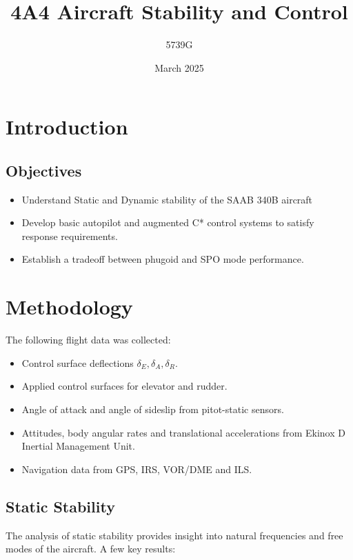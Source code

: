 \documentclass{article}
\begin{document}
\title{4A4 Aircraft Stability and Control}
\author{5739G}
\date{March 2025}
\maketitle

\section{Introduction}



\subsection{Objectives}

\begin{itemize}
    \item Understand Static and Dynamic stability of the SAAB 340B aircraft
    \item Develop basic autopilot and augmented C* control systems to satisfy response requirements.
    \item Establish a tradeoff between phugoid and SPO mode performance.
\end{itemize}

\section{Methodology}

The following flight data was collected:
\begin{itemize}
    \item Control surface deflections $\delta_E, \delta_A, \delta_R$.
    \item Applied control surfaces for elevator and rudder.
    \item Angle of attack and angle of sideslip from pitot-static sensors.
    \item Attitudes, body angular rates and translational accelerations from Ekinox D Inertial Management Unit.
    \item Navigation data from GPS, IRS, VOR/DME and ILS.
\end{itemize}

\subsection{Static Stability}

The analysis of static stability provides insight into natural frequencies and free modes of the aircraft.
A few key results:
\end{document}
